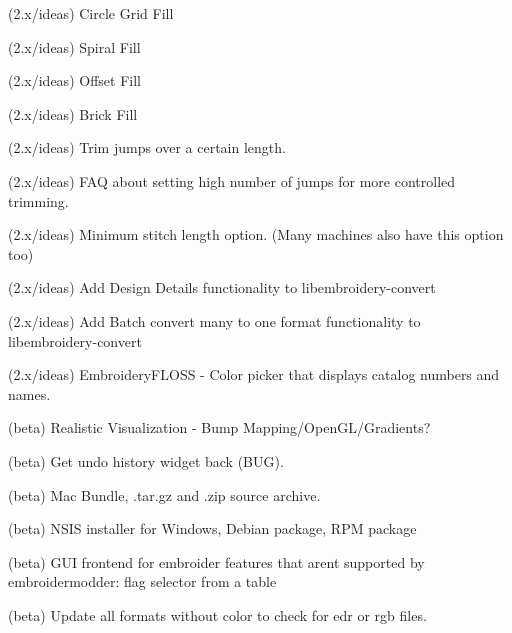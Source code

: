 \begin{DoxyRefList}
\label{todo__todo000123}%
%
(2.\+x/ideas) Circle Grid Fill

\label{todo__todo000124}%
%
(2.\+x/ideas) Spiral Fill

\label{todo__todo000125}%
%
(2.\+x/ideas) Offset Fill

\label{todo__todo000126}%
%
(2.\+x/ideas) Brick Fill

\label{todo__todo000127}%
%
(2.\+x/ideas) Trim jumps over a certain length.

\label{todo__todo000128}%
%
(2.\+x/ideas) FAQ about setting high number of jumps for more controlled trimming.

\label{todo__todo000129}%
%
(2.\+x/ideas) Minimum stitch length option. (Many machines also have this option too)

\label{todo__todo000130}%
%
(2.\+x/ideas) Add \textquotesingle{}Design Details\textquotesingle{} functionality to libembroidery-\/convert

\label{todo__todo000131}%
%
(2.\+x/ideas) Add \textquotesingle{}Batch convert many to one format\textquotesingle{} functionality to libembroidery-\/convert

\label{todo__todo000132}%
%
(2.\+x/ideas) Embroidery\+FLOSS -\/ Color picker that displays catalog numbers and names.

\label{todo__todo000133}%
%
(beta) Realistic Visualization -\/ Bump Mapping/\+Open\+GL/\+Gradients?

\label{todo__todo000134}%
%
(beta) Get undo history widget back (BUG).

\label{todo__todo000135}%
%
(beta) Mac Bundle, .tar.\+gz and .zip source archive.

\label{todo__todo000136}%
%
(beta) NSIS installer for Windows, Debian package, RPM package

\label{todo__todo000137}%
%
(beta) GUI frontend for embroider features that aren\textquotesingle{}t supported by embroidermodder\+: flag selector from a table

\label{todo__todo000138}%
%
(beta) Update all formats without color to check for edr or rgb files.


\end{DoxyRefList}
